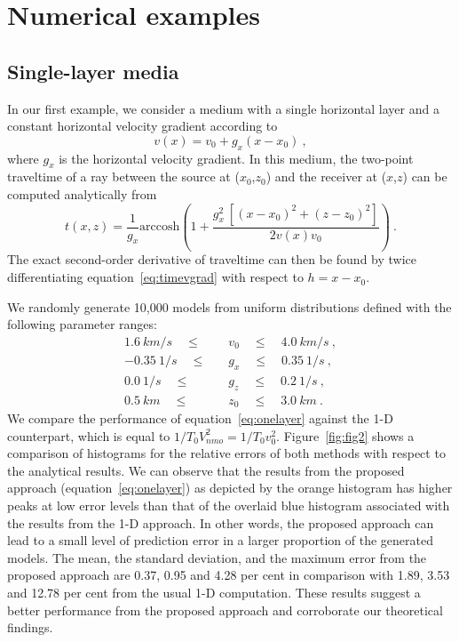 \section{Numerical examples}
\subsection{Single-layer media}
In our first example, we consider a medium with a single horizontal layer and a constant horizontal velocity gradient according to
\begin{equation}
    \label{eq:vgrad}
    v(x) = v_0 + g_x (x - x_0)~,
\end{equation}
where $g_x$ is the horizontal velocity gradient. In this medium, the two-point traveltime of a ray between the source at ($x_0$,$z_0$) and the receiver at ($x$,$z$) can be computed analytically from
\begin{equation}
\label{eq:timevgrad}
t(x,z) = \frac{1}{g_x} \mathrm{arccosh} \left(1+ \frac{g^2_x~[(x-x_0)^2+(z-z_0)^2]}{2v(x)v_0} \right)~.
\end{equation}
The exact second-order derivative of traveltime can then be found by twice differentiating equation~\ref{eq:timevgrad} with respect to $h = x-x_0$. 

We randomly generate 10,000 models from uniform distributions defined with the following parameter ranges:
\begin{align}
    1.6~km/s \quad \le & \quad v_0 \quad \le \quad 4.0~km/s~, \\
    \nonumber
    -0.35~1/s  \quad \le & \quad g_x \quad \le \quad 0.35~1/s~, \\ 
    \nonumber
    0.0~1/s  \quad \le & \quad g_z \quad \le \quad 0.2~1/s~, \\ 
    \nonumber
    0.5~km  \quad \le & \quad z_0 \quad \le \quad 3.0~km~.
\end{align}
We compare the performance of equation~\ref{eq:onelayer} against the 1-D counterpart, which is equal to $1\big/T_0 V^2_{nmo} = 1\big/T_0 v^2_{0}$. Figure~\ref{fig:fig2} shows a comparison of histograms for the relative errors of both methods with respect to the analytical results. We can observe that the results from the proposed approach (equation~\ref{eq:onelayer}) as depicted by the orange histogram has higher peaks at low error levels than that of the overlaid blue histogram associated with the results from the 1-D approach. In other words, the proposed approach can lead to a small level of prediction error in a larger proportion of the generated models. The mean, the standard deviation, and the maximum error from the proposed approach are 0.37, 0.95 and 4.28 per cent in comparison with 1.89, 3.53 and 12.78 per cent from the usual 1-D computation. These results suggest a better performance from the proposed approach and corroborate our theoretical findings.

